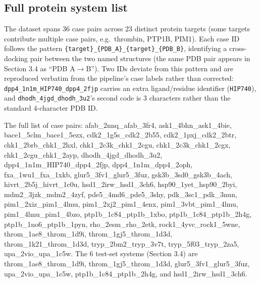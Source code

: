 \documentclass{article}
\begin{document}
\subsection{Full protein system list}
\label{app:systems}

The dataset spans 36 case pairs across 23 distinct protein targets (some targets contribute multiple case pairs, e.g.\ thrombin, PTP1B, PIM1). Each case ID follows the pattern \texttt{\{target\}\_\{PDB\_A\}\_\{target\}\_\{PDB\_B\}}, identifying a cross-docking pair between the two named structures (the same PDB pair appears in Section 3.4 as ``PDB A$\to$B''). Two IDs deviate from this pattern and are reproduced verbatim from the pipeline's case labels rather than corrected: \texttt{dpp4\_1n1m\_HIP740\_dpp4\_2fjp} carries an extra ligand/residue identifier (\texttt{HIP740}), and \texttt{dhodh\_4jgd\_dhodh\_3u2}'s second code is 3 characters rather than the standard 4-character PDB ID.

\begingroup
\raggedright
\small
The full list of case pairs: afab\_2nnq\_afab\_3fr4, ask1\_4bhn\_ask1\_4bie, bace1\_5clm\_bace1\_5ezx, cdk2\_1g5s\_cdk2\_2b55, cdk2\_1pxj\_cdk2\_2btr, chk1\_2brb\_chk1\_2hxl, chk1\_2c3k\_chk1\_2cgu, chk1\_2c3k\_chk1\_2cgx, chk1\_2cgu\_chk1\_2ayp, dhodh\_4jgd\_dhodh\_3u2, dpp4\_1n1m\_HIP740\_dpp4\_2fjp, dpp4\_1n1m\_dpp4\_2oph, fxa\_1wu1\_fxa\_1xkb, glur5\_3fv1\_glur5\_3fuz, gsk3b\_3sd0\_gsk3b\_4ach, hivrt\_2b5j\_hivrt\_1c0u, hsd1\_2irw\_hsd1\_3ch6, hsp90\_1yet\_hsp90\_2byi, mdm2\_3jzk\_mdm2\_4zyf, pde5\_4md6\_pde5\_3shy, pdk\_3sc1\_pdk\_3nun, pim1\_2xiz\_pim1\_4lmu, pim1\_2xj2\_pim1\_4enx, pim1\_3vbt\_pim1\_4lmu, pim1\_4lmu\_pim1\_4bzo, ptp1b\_1c84\_ptp1b\_1xbo, ptp1b\_1c84\_ptp1b\_2h4g, ptp1b\_1no6\_ptp1b\_1pyn, rho\_2esm\_rho\_2etk, rock1\_4yvc\_rock1\_5wne, throm\_1ae8\_throm\_1d9i, throm\_1gj5\_throm\_1d3d, throm\_1k21\_throm\_1d3d, tryp\_2bm2\_tryp\_3v7t, tryp\_5f03\_tryp\_2za5, upa\_2vio\_upa\_1c5w. The 6 test-set systems (Section 3.4) are throm\_1ae8\_throm\_1d9i, throm\_1gj5\_throm\_1d3d, glur5\_3fv1\_glur5\_3fuz, upa\_2vio\_upa\_1c5w, ptp1b\_1c84\_ptp1b\_2h4g, and hsd1\_2irw\_hsd1\_3ch6.
\endgroup

\newpage

\end{document}
